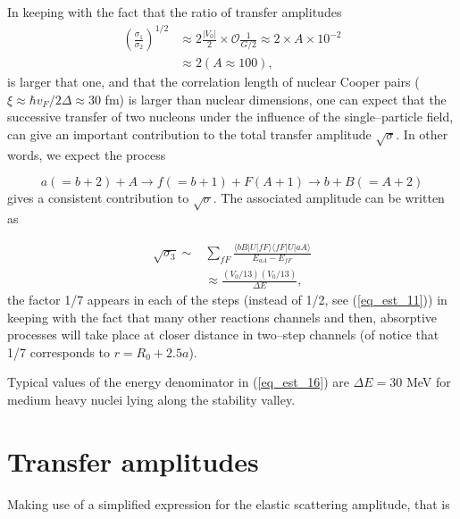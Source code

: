 \documentclass[a4paper,14pt]{article}
\begin{document}
In keeping with the fact that the ratio of transfer amplitudes
\begin{equation}\label{eq_est_14}
\begin{split}
\left(\frac{\sigma_1}{\sigma_2}\right)^{1/2}&\approx 2\frac{|V_0|}{2}\times \mathcal{O}\frac{1}{G/2}\approx 2\times A\times 10^{-2}\\
& \approx 2 (A\approx 100),
\end{split}
\end{equation}
is larger that one, and that the correlation length of nuclear Cooper pairs ($\xi\approx \hbar v_F/2\Delta \approx 30$ fm) is larger than nuclear dimensions, one can expect  that the successive transfer of two nucleons under the influence of the single--particle field, can give an important contribution to the total transfer amplitude $\sqrt{\sigma}$. In other words, we expect the process


\begin{equation}\label{eq_est_15}
a(=b+2)+A \rightarrow f(=b+1)+F(A+1)\rightarrow b+B(=A+2)
\end{equation}
gives a consistent contribution to $\sqrt{\sigma}$. The associated amplitude can be written as

\begin{equation}\label{eq_est_16}
\begin{split}
\sqrt{\sigma_3}\sim & \sum_{fF}\frac{\langle bB|U|fF\rangle \langle fF|U|aA\rangle}{E_{aA}-E_{fF}}\\
& \approx \frac{(V_0/13)(V_0/13)}{\Delta E},
\end{split}
\end{equation}
the factor 1/7 appears in each of the steps (instead of 1/2, see (\ref{eq_est_11})) in keeping with the fact that many other reactions channels and then, absorptive processes will take place at closer distance in two--step channels (of notice that 1/7 corresponds to $r=R_0+2.5 a$).


Typical values of the energy denominator in (\ref{eq_est_16}) are $\Delta E=30$ MeV for medium heavy nuclei lying along the stability valley.

\section{Transfer amplitudes}
Making use of a simplified expression for the elastic scattering amplitude, that is
\end{document}
